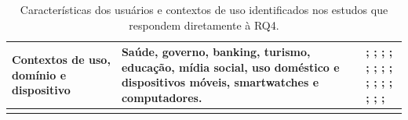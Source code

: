 \begin{longtable}{|p{3.2cm}|p{6cm}|p{5.8cm}|}
Contextos de uso, domínio e dispositivo &
Saúde, governo, banking, turismo, educação, mídia social, uso doméstico e dispositivos móveis, smartwatches e computadores. &
\cite{health_problem_solving}; \cite{trilar2021family}; \cite{gatsou2017seniors}; \cite{martinez2020effectiveness}; \cite{duarte2025designing}; \cite{balakrishnan2012user}; \cite{kymäläinen2012creating}; \cite{gonzalez2025augmenting}; \cite{finn2013usability}; \cite{arfaa2015usability}; \cite{lum2016development}; \cite{secure_messaging}; \cite{esticky2023}; \cite{chittaro2003guiding}; \cite{kanjanakuha2019comprehensibility}; \cite{becker2004study} \\ \hline
\caption{Características dos usuários e contextos de uso identificados nos estudos que respondem diretamente à RQ4.}
\label{tab:caracteristicasRQ4}
\end{longtable}
